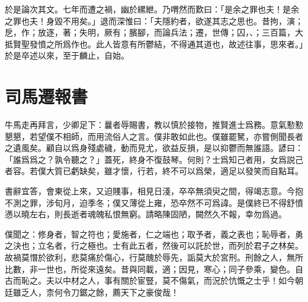 於是論次其文。七年而遭之禍，幽於縲紲。乃喟然而歎曰：「是余之罪也夫！是余之罪也夫！身毀不用矣。」退而深惟曰：「夫隱約者，欲遂其志之思也。昔拘，演；戹，作；放逐，著；失明，厥有；臏腳，而論兵法；遷，世傳；囚，、；三百篇，大抵賢聖發憤之所爲作也。此人皆意有所鬱結，不得通其道也，故述往事，思來者。」於是卒述以來，至于麟止，自始。

\theendnotes

\section[報任安書\quad{\small 司馬遷}]{{\normalsize 司馬遷}\quad 報書}
牛馬走再拜言，少卿足下：曩者辱賜書，教以慎於接物，推賢進士爲務。意氣懃懃懇懇，若望僕不相師，而用流俗人之言。僕非敢如此也。僕雖罷駑，亦嘗側聞長者之遺風矣。顧自以爲身殘處穢，動而見尤，欲益反損，是以抑鬱而無誰語。諺曰：「誰爲爲之？孰令聽之？」蓋死，終身不復鼓琴。何則？士爲知己者用，女爲説己者容。若僕大質已虧缺矣，雖才懷，行若，終不可以爲榮，適足以發笑而自點耳。

書辭宜答，會東從上來，又迫賤事，相見日淺，卒卒無須臾之間，得竭志意。今抱不測之罪，涉旬月，迫季冬；僕又薄從上雍，恐卒然不可爲諱。是僕終已不得舒憤懣以曉左右，則長逝者魂魄私恨無窮。請略陳固陋，闕然久不報，幸勿爲過。

僕聞之：修身者，智之符也；愛施者，仁之端也；取予者，義之表也；恥辱者，勇之決也；立名者，行之極也。士有此五者，然後可以託於世，而列於君子之林矣。故禍莫憯於欲利，悲莫痛於傷心，行莫醜於辱先，詬莫大於宮刑。刑餘之人，無所比數，非一世也，所從來遠矣。昔與同載，適；因見，寒心；同子參乘，變色。自古而恥之。夫以中材之人，事有關於宦豎，莫不傷氣，而況於忼慨之士乎！如今朝廷雖乏人，柰何令刀鋸之餘，薦天下之豪俊哉！

